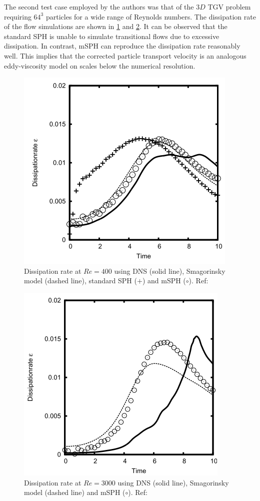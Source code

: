 The second test case employed by the authors was that of the $3D$ TGV problem requiring $64^3$ particles for a wide range of Reynolds numbers. The dissipation rate of the flow simulations are shown in \ref{fig:adami2012-dissipation-re400} and \ref{fig:adami2012-dissipation-re3000}. It can be observed that the standard SPH is unable to simulate transitional flows due to excessive dissipation. In contrast, mSPH can reproduce the dissipation rate reasonably well. This implies that the corrected particle transport velocity is an analogous eddy-viscosity model on scales below the numerical resolution.
\begin{figure}[h]
    \centering
    \includegraphics[scale=0.8]{Figures/research_papers/adami2012-dissipation-re400.png}
    \caption{Dissipation rate at $Re = 400$ using DNS (solid line), Smagorinsky model (dashed line), standard SPH ($+$) and mSPH ($\circ$). Ref: \parencite{Adami2012}}
    \label{fig:adami2012-dissipation-re400}
\end{figure}
\begin{figure}[h]
    \centering
    \includegraphics[scale=0.8]{Figures/research_papers/adami2012-dissipation-re3000.png}
    \caption{Dissipation rate at $Re = 3000$ using DNS (solid line), Smagorinsky model (dashed line) and mSPH ($\circ$). Ref: \parencite{Adami2012}}
    \label{fig:adami2012-dissipation-re3000}
\end{figure}


